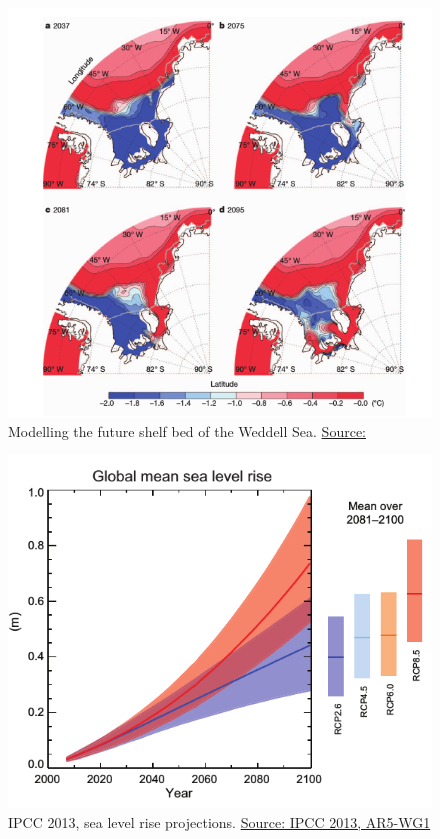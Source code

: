 \documentclass{beamer}
\begin{document}
\begin{frame}
\begin{figure}
\includegraphics[width=0.7\linewidth]{./Images/Hellmer2012_CDWshoaling.png}
\caption{\label{fig:HellmerCDW} Modelling the future shelf bed of the Weddell Sea. \href{https://www.nature.com/articles/nature11064}{\tiny Source: \citep{hellmer2012} }}
\end{figure}
\end{frame}



\begin{frame}
\begin{figure}
\includegraphics[width=\linewidth]{./Images/IPCC_GMSL_2100.png}
\caption{\label{fig:IPCC_SLR} IPCC 2013, sea level rise projections. \href{http://www.ipcc.ch/report/ar5/}{\tiny Source: IPCC 2013, AR5-WG1 }}
\end{figure}
\end{frame}
\end{document}
